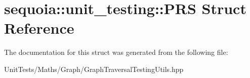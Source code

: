 \hypertarget{structsequoia_1_1unit__testing_1_1_p_r_s}{}\section{sequoia\+::unit\+\_\+testing\+::P\+RS Struct Reference}
\label{structsequoia_1_1unit__testing_1_1_p_r_s}


The documentation for this struct was generated from the following file\+:\begin{DoxyCompactItemize}
\item 
Unit\+Tests/\+Maths/\+Graph/Graph\+Traversal\+Testing\+Utils.\+hpp\end{DoxyCompactItemize}
